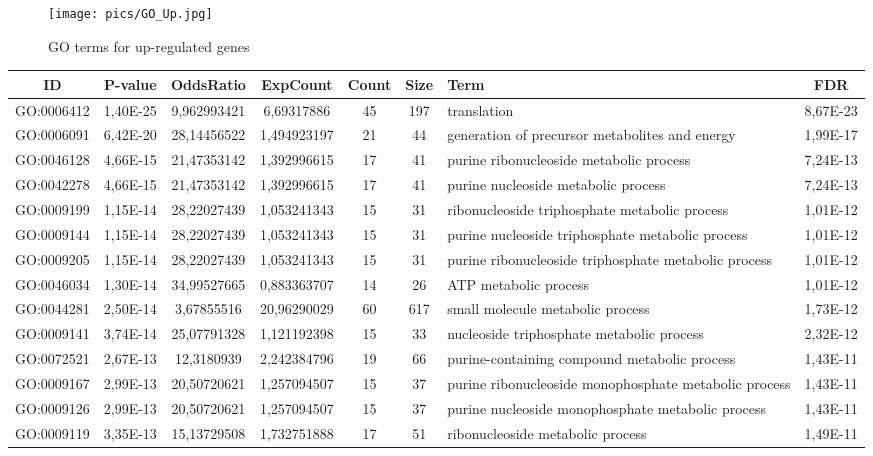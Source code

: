 \documentclass[12pt, a4paper]{report}
\begin{document}
\begin{figure}[H]
	\centering	
	\texttt{[image: pics/GO\_Up.jpg]}
	\caption[GO terms for up-regulated genes]
	{GO terms for up-regulated genes}
	\label{fig:goup}
\end{figure}

\begin{table}[H]
	\centering
	\tiny
	\begin{tabular}{c|c|c|c|c|c|p{4cm}|c}
		\textbf{ID}&\textbf{P-value}&\textbf{OddsRatio}&\textbf{ExpCount}&\textbf{Count}&\textbf{Size}& \textbf{Term}&\textbf{FDR}\\
		\hline
GO:0006412&	1,40E-25&	9,962993421&	6,69317886&	45&	197&	translation&	8,67E-23\\
GO:0006091&	6,42E-20&	28,14456522&	1,494923197&	21&	44&	generation of precursor metabolites and energy&	1,99E-17\\
GO:0046128&	4,66E-15&	21,47353142&	1,392996615&	17&	41&	purine ribonucleoside metabolic process&	7,24E-13\\
GO:0042278&	4,66E-15&	21,47353142&	1,392996615&	17&	41&	purine nucleoside metabolic process&	7,24E-13\\
GO:0009199&	1,15E-14&	28,22027439&	1,053241343&	15&	31&	ribonucleoside triphosphate metabolic process&	1,01E-12\\
GO:0009144&	1,15E-14&	28,22027439&	1,053241343&	15&	31&	purine nucleoside triphosphate metabolic process&	1,01E-12\\
GO:0009205&	1,15E-14&	28,22027439&	1,053241343&	15&	31&	purine ribonucleoside triphosphate metabolic process&	1,01E-12\\
GO:0046034&	1,30E-14&	34,99527665&	0,883363707&	14&	26&	ATP metabolic process&	1,01E-12\\
GO:0044281&	2,50E-14&	3,67855516&	20,96290029&	60&	617&	small molecule metabolic process&	1,73E-12\\
GO:0009141&	3,74E-14&	25,07791328&	1,121192398&	15&	33&	nucleoside triphosphate metabolic process&	2,32E-12\\
GO:0072521&	2,67E-13&	12,3180939&	2,242384796&	19&	66&	purine-containing compound metabolic process&	1,43E-11\\
GO:0009167&	2,99E-13&	20,50720621&	1,257094507&	15&	37&	purine ribonucleoside monophosphate metabolic process&	1,43E-11\\
GO:0009126&	2,99E-13&	20,50720621&	1,257094507&	15&	37&	purine nucleoside monophosphate metabolic process&	1,43E-11\\
GO:0009119&	3,35E-13&	15,13729508&	1,732751888&	17&	51&	ribonucleoside metabolic process&	1,49E-11\\

\end{tabular}
\end{table}
\end{document}

